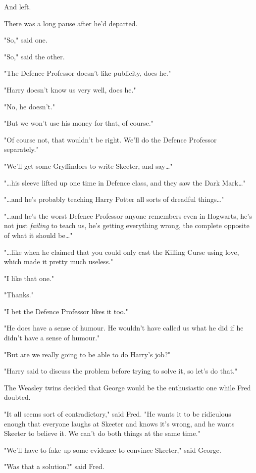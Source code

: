 And left.

There was a long pause after he'd departed.

"So," said one.

"So," said the other.

"The Defence Professor doesn't like publicity, does he."

"Harry doesn't know us very well, does he."

"No, he doesn't."

"But we won't use his money for that, of course."

"Of course not, that wouldn't be right. We'll do the Defence Professor
separately."

"We'll get some Gryffindors to write Skeeter, and say{\ldots}"

"{\ldots}his sleeve lifted up one time in Defence class, and they saw the Dark
Mark{\ldots}"

"{\ldots}and he's probably teaching Harry Potter all sorts of dreadful
things{\ldots}"

"{\ldots}and he's the worst Defence Professor anyone remembers even in
Hogwarts, he's not just \emph{failing} to teach us, he's getting everything
wrong, the complete opposite of what it should be{\ldots}"

"{\ldots}like when he claimed that you could only cast the Killing Curse using
love, which made it pretty much useless."

"I like that one."

"Thanks."

"I bet the Defence Professor likes it too."

"He does have a sense of humour. He wouldn't have called us what he did if he
didn't have a sense of humour."

"But are we really going to be able to do Harry's job?"

"Harry said to discuss the problem before trying to solve it, so let's do that."

The Weasley twins decided that George would be the enthusiastic one while Fred
doubted.

"It all seems sort of contradictory," said Fred. "He wants it to be ridiculous
enough that everyone laughs at Skeeter and knows it's wrong, and he wants
Skeeter to believe it. We can't do both things at the same time."

"We'll have to fake up some evidence to convince Skeeter," said George.

"Was that a solution?" said Fred.

